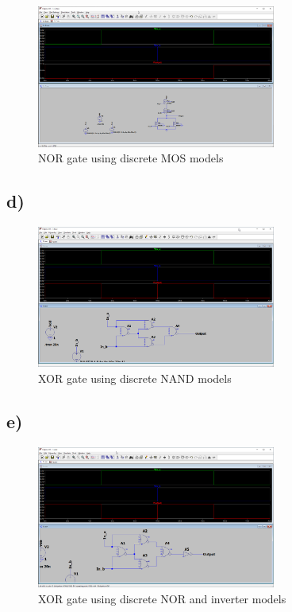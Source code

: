 \documentclass{article}
\begin{document}
	\begin{figure}[H]
	    \centering
	    \includegraphics[width=0.7\textwidth]{1c-2-sim}
	    \caption{NOR gate using discrete MOS models}
	\end{figure}
	

	\subsection*{d)}
	
	\begin{figure}[H]
	    \centering
	    \includegraphics[width=0.7\textwidth]{1d-sim}
	    \caption{XOR gate using discrete NAND models}
	\end{figure}


	\subsection*{e)}
	
	\begin{figure}[H]
	    \centering
	    \includegraphics[width=0.7\textwidth]{1e-sim}
	    \caption{XOR gate using discrete NOR and inverter models}
	\end{figure}
\end{document}
